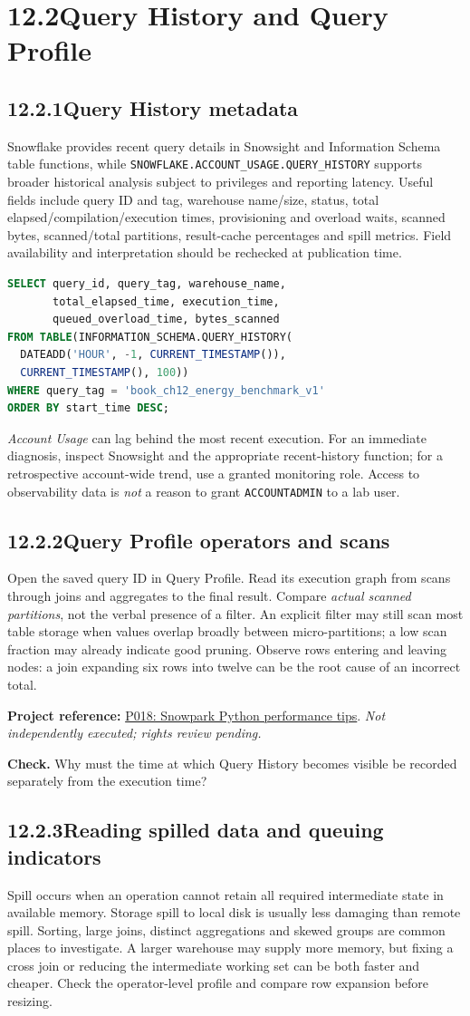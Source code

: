 \documentclass[11pt,twoside]{article}
\newcommand{\topic}[2]{\subsection*{#1\quad #2}}
\newcommand{\repo}[2]{\par\begingroup\fontsize{8.0}{9.6}\selectfont\sffamily\color{inkgray}\textbf{Project reference:} \href{#2}{#1}. \textit{Not independently executed; rights review pending.}\par\endgroup}
\begin{document}
\section*{12.2\quad Query History and Query Profile}
\topic{12.2.1}{Query History metadata}
Snowflake provides recent query details in Snowsight and Information Schema table functions, while \texttt{SNOWFLAKE.ACCOUNT\_USAGE.QUERY\_HISTORY} supports broader historical analysis subject to privileges and reporting latency. Useful fields include query ID and tag, warehouse name/size, status, total elapsed/compilation/execution times, provisioning and overload waits, scanned bytes, scanned/total partitions, result-cache percentages and spill metrics. Field availability and interpretation should be rechecked at publication time.
\begin{lstlisting}[language=SQL,caption={Recent per-user history: permitted users only.}]
SELECT query_id, query_tag, warehouse_name,
       total_elapsed_time, execution_time,
       queued_overload_time, bytes_scanned
FROM TABLE(INFORMATION_SCHEMA.QUERY_HISTORY(
  DATEADD('HOUR', -1, CURRENT_TIMESTAMP()),
  CURRENT_TIMESTAMP(), 100))
WHERE query_tag = 'book_ch12_energy_benchmark_v1'
ORDER BY start_time DESC;
\end{lstlisting}
\emph{Account Usage} can lag behind the most recent execution. For an immediate diagnosis, inspect Snowsight and the appropriate recent-history function; for a retrospective account-wide trend, use a granted monitoring role. Access to observability data is \emph{not} a reason to grant \texttt{ACCOUNTADMIN} to a lab user.
\topic{12.2.2}{Query Profile operators and scans}
Open the saved query ID in Query Profile. Read its execution graph from scans through joins and aggregates to the final result. Compare \emph{actual scanned partitions}, not the verbal presence of a filter. An explicit filter may still scan most table storage when values overlap broadly between micro-partitions; a low scan fraction may already indicate good pruning. Observe rows entering and leaving nodes: a join expanding six rows into twelve can be the root cause of an incorrect total.
\repo{P018: Snowpark Python performance tips}{https://github.com/Snowflake-Labs/sfguide-snowpark-python-top-three-tips-for-optimal-performance}
\textbf{Check.} Why must the time at which Query History becomes visible be recorded separately from the execution time?
\newpage
\topic{12.2.3}{Reading spilled data and queuing indicators}
Spill occurs when an operation cannot retain all required intermediate state in available memory. Storage spill to local disk is usually less damaging than remote spill. Sorting, large joins, distinct aggregations and skewed groups are common places to investigate. A larger warehouse may supply more memory, but fixing a cross join or reducing the intermediate working set can be both faster and cheaper. Check the operator-level profile and compare row expansion before resizing.
\end{document}
